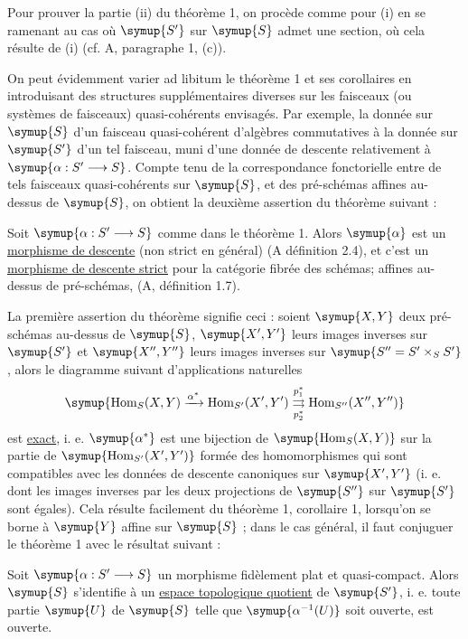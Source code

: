 Pour prouver la partie (ii) du théorème 1, on procède comme pour (i) en se
ramenant au cas où $\symup{S'}$ sur $\symup{S}$ admet une section, où cela résulte de (i)
(cf. A, paragraphe 1, (c)).

On peut évidemment varier ad libitum le théorème 1 et ses corollaires en
introduisant des structures supplémentaires diverses sur les faisceaux (ou
systèmes de faisceaux) quasi-cohérents envisagés. Par exemple, la donnée sur
$\symup{S}$ d'un faisceau
quasi-cohérent d'algèbres commutatives  à la donnée sur $\symup{S'}$ d'un
tel faisceau, muni d'une donnée de descente relativement à
$\symup{\alpha:S'\longrightarrow S}$. Compte tenu de la correspondance fonctorielle
entre de tels faisceaux quasi-cohérents sur $\symup{S}$, et des pré-schémas affines
au-dessus de $\symup{S}$, on obtient la deuxième assertion du théorème suivant :

 Soit $\symup{\alpha:S'\longrightarrow S}$ comme dans le
théorème 1. Alors $\symup{\alpha}$ est un \uline{morphisme de descente} (non strict en
général) (A définition 2.4), et c'est un \uline{morphisme de descente strict}
pour la catégorie fibrée des schémas; affines au-dessus de pré-schémas,
(A, définition 1.7).

La première assertion du théorème signifie ceci : soient $\symup{X,Y}$ deux
pré-schémas au-dessus de $\symup{S}$, $\symup{X',Y'}$ leurs images inverses sur $\symup{S'}$ et
$\symup{X'',Y''}$ leurs images inverses sur $\symup{S''=S'\times_SS'}$, alors le diagramme
suivant d'applications naturelles
\[
  \symup{\operatorname{Hom}_S(X,Y)\xrightarrow{\alpha^*}
  \operatorname{Hom}_{S'}(X',Y')
  \underset{p_2^*}{\overset{p_1^*}{\rightrightarrows}}
  \operatorname{Hom}_{S''}(X'',Y'')}
\]
est \uline{exact}, i. e. $\symup{\alpha^*}$ est une bijection de
$\symup{\operatorname{Hom}_S(X,Y)}$ sur la partie de
$\symup{\operatorname{Hom}_{S'}(X',Y')}$ formée des homomorphismes qui sont compatibles
avec les données de descente canoniques sur $\symup{X',Y'}$ (i. e. dont les images
inverses par les deux projections de $\symup{S''}$ sur $\symup{S'}$ sont égales). Cela résulte
facilement du théorème 1, corollaire 1, lorsqu'on se borne à $\symup{Y}$ affine sur
$\symup{S}$ ; dans le cas général, il faut conjuguer le théorème 1 avec le résultat
suivant :

 Soit $\symup{\alpha:S'\longrightarrow S}$ un morphisme fidèlement
plat et quasi-compact. Alors $\symup{S}$ s'identifie à un \uline{espace topologique quotient} de $\symup{S'}$, i. e. toute partie $\symup{U}$ de $\symup{S}$ telle que
$\symup{\alpha^{-1}(U)}$ soit ouverte, est ouverte.

